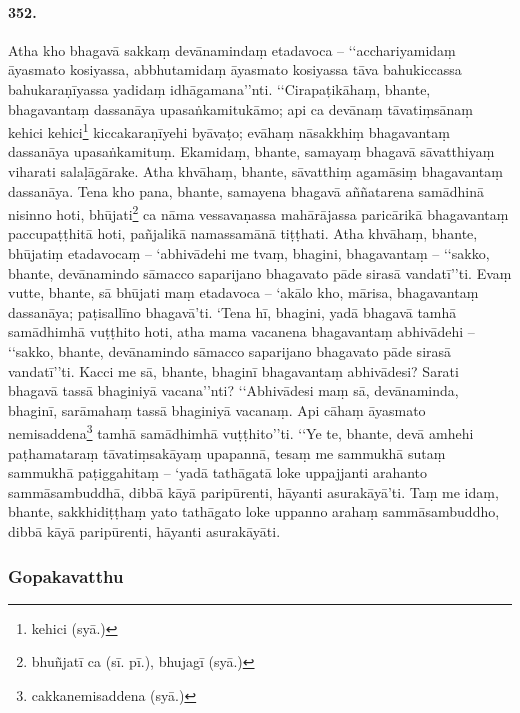 \paragraph{352.} Atha kho bhagavā sakkaṃ devānamindaṃ etadavoca – ‘‘acchariyamidaṃ āyasmato kosiyassa, abbhutamidaṃ āyasmato kosiyassa tāva bahukiccassa bahukaraṇīyassa yadidaṃ idhāgamana’’nti. ‘‘Cirapaṭikāhaṃ, bhante, bhagavantaṃ dassanāya upasaṅkamitukāmo; api ca devānaṃ tāvatiṃsānaṃ kehici kehici\footnote{kehici (syā.)} kiccakaraṇīyehi byāvaṭo; evāhaṃ nāsakkhiṃ bhagavantaṃ dassanāya upasaṅkamituṃ. Ekamidaṃ, bhante, samayaṃ bhagavā sāvatthiyaṃ viharati salaḷāgārake. Atha khvāhaṃ, bhante, sāvatthiṃ agamāsiṃ bhagavantaṃ dassanāya. Tena kho pana, bhante, samayena bhagavā aññatarena samādhinā nisinno hoti, bhūjati\footnote{bhuñjatī ca (sī. pī.), bhujagī (syā.)} ca nāma vessavaṇassa mahārājassa paricārikā bhagavantaṃ paccupaṭṭhitā hoti, pañjalikā namassamānā tiṭṭhati. Atha khvāhaṃ, bhante, bhūjatiṃ etadavocaṃ – ‘abhivādehi me tvaṃ, bhagini, bhagavantaṃ – ‘‘sakko, bhante, devānamindo sāmacco saparijano bhagavato pāde sirasā vandatī’’ti. Evaṃ vutte, bhante, sā bhūjati maṃ etadavoca – ‘akālo kho, mārisa, bhagavantaṃ dassanāya; paṭisallīno bhagavā’ti. ‘Tena hī, bhagini, yadā bhagavā tamhā samādhimhā vuṭṭhito hoti, atha mama vacanena bhagavantaṃ abhivādehi – ‘‘sakko, bhante, devānamindo sāmacco saparijano bhagavato pāde sirasā vandatī’’ti. Kacci me sā, bhante, bhaginī bhagavantaṃ abhivādesi? Sarati bhagavā tassā bhaginiyā vacana’’nti? ‘‘Abhivādesi maṃ sā, devānaminda, bhaginī, sarāmahaṃ tassā bhaginiyā vacanaṃ. Api cāhaṃ āyasmato nemisaddena\footnote{cakkanemisaddena (syā.)} tamhā samādhimhā vuṭṭhito’’ti. ‘‘Ye te, bhante, devā amhehi paṭhamataraṃ tāvatiṃsakāyaṃ upapannā, tesaṃ me sammukhā sutaṃ sammukhā paṭiggahitaṃ – ‘yadā tathāgatā loke uppajjanti arahanto sammāsambuddhā, dibbā kāyā paripūrenti, hāyanti asurakāyā’ti. Taṃ me idaṃ, bhante, sakkhidiṭṭhaṃ yato tathāgato loke uppanno arahaṃ sammāsambuddho, dibbā kāyā paripūrenti, hāyanti asurakāyāti.

\subsubsection{Gopakavatthu}

